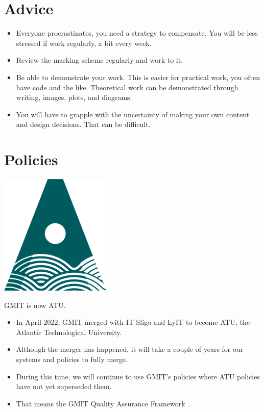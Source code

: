 \documentclass[a4paper]{tufte-handout}
\begin{document}
\section{Advice}

\begin{itemize}
  \item Everyone procrastinates, you need a strategy to compensate. You will be less stressed if work regularly, a bit every week.
  \item Review the marking scheme regularly and work to it.
  \item Be able to demonstrate your work. This is easier for practical work, you often have code and the like. Theoretical work can be demonstrated through writing, images, plots, and diagrams.
  \item You will have to grapple with the uncertainty of making your own content and design decisions. That can be difficult.
\end{itemize}


\section{Policies}

\begin{marginfigure}%
  \centering
  \includegraphics[width=0.6\linewidth]{img/atu-green.png}
  \caption*{GMIT is now ATU.}
  \label{fig:atulogo}
\end{marginfigure}

\begin{itemize}
  \item In April 2022, GMIT merged with IT Sligo and LyIT to become ATU, the Atlantic Technological University.
  \item Although the merger has happened, it will take a couple of years for our systems and policies to fully merge.
  \item During this time, we will continue to use GMIT's policies where ATU policies have not yet superseded them.
  \item That means the GMIT Quality Assurance Framework~\cite{gmitqaf}.
\end{itemize} 



\end{document}
